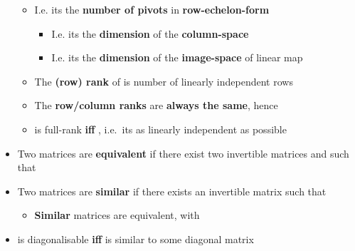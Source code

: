 \begin{itemize}
  \begin{itemize}
  
  \item
    I.e. its the \textbf{number of pivots} in \textbf{row-echelon-form}

    \begin{itemize}
    
    \item
      I.e. its the \textbf{dimension} of the \textbf{column-space}
    \item
      I.e. its the \textbf{dimension} of the \textbf{image-space}
       of linear map
    \end{itemize}
  \item
    The \textbf{(row) rank} of  is number of linearly
    independent rows
  \item
    The \textbf{row/column ranks} are \textbf{always the same}, hence
  \item
     is full-rank \textbf{iff}
    , i.e.~its as linearly independent
    as possible
  \end{itemize}
\item
  Two matrices
  are \textbf{equivalent} if there exist two invertible matrices
    and
   such that
\item
  Two matrices
  are \textbf{similar} if there exists an invertible matrix
    such that

  \begin{itemize}
  
  \item
    \textbf{Similar} matrices are equivalent, with
  \end{itemize}
\item
   is diagonalisable \textbf{iff}  is similar to some
  diagonal matrix 
\end{itemize}

